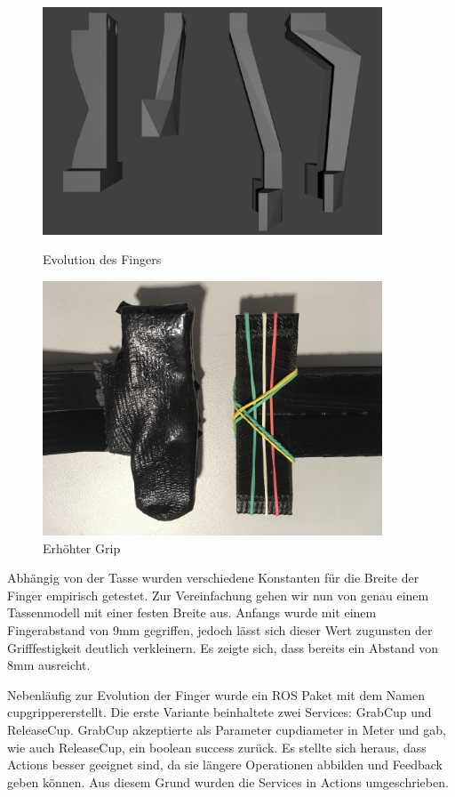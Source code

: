 \begin{figure}
    \centering
    \begin{minipage}{0.45\textwidth}
        \centering
        \includegraphics[width=0.9\textwidth]{images/finger_evolution.png} %
        \caption{Evolution des Fingers}
    \end{minipage}\hfill
    \begin{minipage}{0.45\textwidth}
        \centering
        \includegraphics[width=0.9\textwidth]{images/finger_tip.JPG} %
        \caption{Erhöhter Grip}
    \end{minipage}
\end{figure}

Abhängig von der Tasse wurden verschiedene Konstanten für die Breite der Finger empirisch getestet. Zur Vereinfachung gehen wir nun von genau einem Tassenmodell mit einer festen Breite aus. Anfangs wurde mit einem Fingerabstand von 9mm gegriffen, jedoch lässt sich dieser Wert zugunsten der Grifffestigkeit deutlich verkleinern. Es zeigte sich, dass bereits ein Abstand von 8mm ausreicht.

Nebenläufig zur Evolution der Finger wurde ein ROS Paket mit dem Namen \glqq cup\textunderscore gripper\grqq  erstellt. Die erste Variante beinhaltete zwei Services: GrabCup und ReleaseCup. GrabCup akzeptierte als Parameter cup\textunderscore diameter in Meter und gab, wie auch ReleaseCup, ein boolean success zurück. Es stellte sich heraus, dass Actions besser geeignet sind, da sie längere Operationen abbilden und Feedback geben können. Aus diesem Grund wurden die Services in Actions umgeschrieben.
